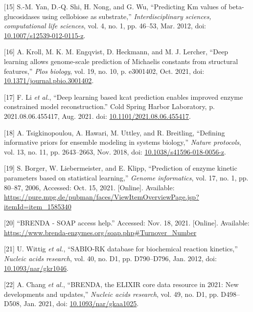 \documentclass[11pt]{article}
\begin{document}
\hypertarget{citeproc_bib_item_15}{[15] S.-M. Yan, D.-Q. Shi, H. Nong, and G. Wu, “Predicting Km values of beta-glucosidases using cellobiose as substrate,” \textit{Interdisciplinary sciences, computational life sciences}, vol. 4, no. 1, pp. 46–53, Mar. 2012, doi: \href{https://doi.org/10.1007/s12539-012-0115-z}{10.1007/s12539-012-0115-z}.}

\hypertarget{citeproc_bib_item_16}{[16] A. Kroll, M. K. M. Engqvist, D. Heckmann, and M. J. Lercher, “Deep learning allows genome-scale prediction of Michaelis constants from structural features,” \textit{Plos biology}, vol. 19, no. 10, p. e3001402, Oct. 2021, doi: \href{https://doi.org/10.1371/journal.pbio.3001402}{10.1371/journal.pbio.3001402}.}

\hypertarget{citeproc_bib_item_17}{[17] F. Li \textit{et al.}, “Deep learning based kcat prediction enables improved enzyme constrained model reconstruction.” Cold Spring Harbor Laboratory, p. 2021.08.06.455417, Aug. 2021. doi: \href{https://doi.org/10.1101/2021.08.06.455417}{10.1101/2021.08.06.455417}.}

\hypertarget{citeproc_bib_item_18}{[18] A. Tsigkinopoulou, A. Hawari, M. Uttley, and R. Breitling, “Defining informative priors for ensemble modeling in systems biology,” \textit{Nature protocols}, vol. 13, no. 11, pp. 2643–2663, Nov. 2018, doi: \href{https://doi.org/10.1038/s41596-018-0056-z}{10.1038/s41596-018-0056-z}.}

\hypertarget{citeproc_bib_item_19}{[19] S. Borger, W. Liebermeister, and E. Klipp, “Prediction of enzyme kinetic parameters based on statistical learning,” \textit{Genome informatics}, vol. 17, no. 1, pp. 80–87, 2006, Accessed: Oct. 15, 2021. [Online]. Available: \url{https://pure.mpg.de/pubman/faces/ViewItemOverviewPage.jsp?itemId=item_1585340}}

\hypertarget{citeproc_bib_item_20}{[20] “BRENDA - SOAP access help.” Accessed: Nov. 18, 2021. [Online]. Available: \url{https://www.brenda-enzymes.org/soap.php#Turnover_Number}}

\hypertarget{citeproc_bib_item_21}{[21] U. Wittig \textit{et al.}, “SABIO-RK database for biochemical reaction kinetics,” \textit{Nucleic acids research}, vol. 40, no. D1, pp. D790–D796, Jan. 2012, doi: \href{https://doi.org/10.1093/nar/gkr1046}{10.1093/nar/gkr1046}.}

\hypertarget{citeproc_bib_item_22}{[22] A. Chang \textit{et al.}, “BRENDA, the ELIXIR core data resource in 2021: New developments and updates,” \textit{Nucleic acids research}, vol. 49, no. D1, pp. D498–D508, Jan. 2021, doi: \href{https://doi.org/10.1093/nar/gkaa1025}{10.1093/nar/gkaa1025}.}
\end{document}
